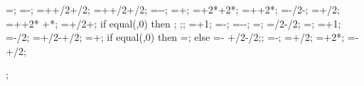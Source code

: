 {{\ssinterrightstarty=\rightwallh;
\ssinterdeltax=\ssinterrightstartx-\ssinterleftstartx;
\ssinterleftdeltay=\leftwallh+\supportheight+\baselinet/2+\ssinterlinet/2;
\ssinterrightdeltay=\rightwallh+\supportheight+\baselinet/2+\ssinterlinet/2;
\markssleftstartx=-\supportwidth-\markssexspace;
\markssleftstarty=\basewalldepth+\markssexspace;
\markssdeltax=\buildingwidth+2*\supportwidth+2*\markssexspace;
\markssdeltay=\basewalldepth+\supportheight+2*\markssexspace;
\supershadestartx=-\collinet/2-\supershadespace;
\supershadestarty=\basewalldepth+\baselinet/2;
\supershadedeltax=\buildingwidth+\collinet+2*\supershadespace
 +*\showdefl;
\supershadedeltay=\superstorynumber*\storyheight+\beamlinet/2+\supershadespace;
if equal(\showlessbays,0) then {
;
;};
\startcol=\leftbays+1;
\endcol=\columnnumber-\rightbays;
\superbays=\baynumber-\leftbays-\rightbays;
\superwidth=\superbays*\baywidth;
\groundbeamshifty=\groundbeamlinet/2-\baselinet/2;
\shearwallstartcolumn=\shearwallbay;
\shearwallendcolumn=\shearwallbay+1;
\shearwallstartx=\x{\shearwallstartcolumn}-\collinet/2;
\shearwallstarty=+\baselinet/2-+\shearwalllinet/2;
\shearwalldeltax=\baywidth+\collinet;
if equal(\superstorynumber,0) then {
\shearwalldeltay=\y{\levelnumber};} else
{\shearwalldeltay=\y{\levelnumber}-\shearwallstarty
+\beamlinet/2-\shearwalllinet/2;};
\marksuperleftstartx=\x{\startcol}-\marksuperexspace;
\marksuperleftstarty=\basewalldepth+\marksuperexspace/2;
\marksuperdeltax=\superwidth+2*\marksuperexspace;
\marksuperdeltay=\y{\levelnumber}-+\marksuperexspace/2;
}   %

\begin{scope}[x=1pt, y=1pt, xshift=\startx, yshift=\starty, rotate=0];


\end{scope}}
